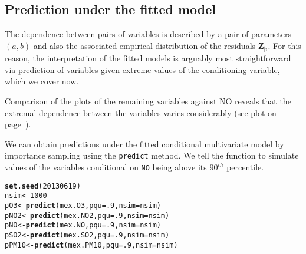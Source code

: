 \documentclass[10pt]{article}\usepackage[]{graphicx}\usepackage[]{color}
\makeatletter
\newcommand{\hlnum}[1]{\textcolor[rgb]{0.686,0.059,0.569}{#1}}%
\newcommand{\hlstd}[1]{\textcolor[rgb]{0.345,0.345,0.345}{#1}}%
\newcommand{\hlkwb}[1]{\textcolor[rgb]{0.69,0.353,0.396}{#1}}%
\newcommand{\hlkwc}[1]{\textcolor[rgb]{0.333,0.667,0.333}{#1}}%
\newcommand{\hlkwd}[1]{\textcolor[rgb]{0.737,0.353,0.396}{\textbf{#1}}}%
\newenvironment{kframe}{%
 \def\at@end@of@kframe{}%
 \ifinner\ifhmode%
  \def\at@end@of@kframe{\end{minipage}}%
  \begin{minipage}{\columnwidth}%
 \fi\fi%
 \def\FrameCommand##1{\hskip\@totalleftmargin \hskip-\fboxsep
 \colorbox{shadecolor}{##1}\hskip-\fboxsep
     \hskip-\linewidth \hskip-\@totalleftmargin \hskip\columnwidth}%
 \MakeFramed {\advance\hsize-\width
   \@totalleftmargin\z@ \linewidth\hsize
   \@setminipage}}%
 {\par\unskip\endMakeFramed%
 \at@end@of@kframe}
\newenvironment{knitrout}{}{} %
\def\bZ{\boldsymbol Z}
\makeatother
\begin{document}
%
\subsection{Prediction under the fitted model}
%
The dependence between pairs of variables is described by a pair of parameters
$(a,b)$ and also the associated empirical distribution of the residuals
$\bZ_{|i}$.  For this reason, the interpretation of the fitted models is
arguably most straightforward via prediction of variables given extreme values
of the conditioning variable, which we cover now.

Comparison of the plots of the remaining variables against NO
reveals that the extremal dependence between the variables
varies considerably (see plot on page~\pageref{fig:NO.Data}).

We can obtain predictions under the fitted conditional multivariate
model by importance sampling using the {\tt predict} method. We tell the function
to simulate values of the variables conditional on {\tt NO}
being above its $90^{th}$ percentile.

\begin{knitrout}
\color{fgcolor}\begin{kframe}
\begin{alltt}
\hlkwd{set.seed}\hlstd{(}\hlnum{20130619}\hlstd{)}
\hlstd{nsim} \hlkwb{<-} \hlnum{1000}
\hlstd{pO3} \hlkwb{<-} \hlkwd{predict}\hlstd{(mex.O3,} \hlkwc{pqu}\hlstd{=}\hlnum{.9}\hlstd{,} \hlkwc{nsim}\hlstd{=nsim)}
\hlstd{pNO2} \hlkwb{<-} \hlkwd{predict}\hlstd{(mex.NO2,} \hlkwc{pqu}\hlstd{=}\hlnum{.9}\hlstd{,} \hlkwc{nsim}\hlstd{=nsim)}
\hlstd{pNO} \hlkwb{<-} \hlkwd{predict}\hlstd{(mex.NO,} \hlkwc{pqu}\hlstd{=}\hlnum{.9}\hlstd{,} \hlkwc{nsim}\hlstd{=nsim)}
\hlstd{pSO2} \hlkwb{<-} \hlkwd{predict}\hlstd{(mex.SO2,} \hlkwc{pqu}\hlstd{=}\hlnum{.9}\hlstd{,} \hlkwc{nsim}\hlstd{=nsim)}
\hlstd{pPM10} \hlkwb{<-} \hlkwd{predict}\hlstd{(mex.PM10,} \hlkwc{pqu}\hlstd{=}\hlnum{.9}\hlstd{,} \hlkwc{nsim}\hlstd{=nsim)}
\end{alltt}
\end{kframe}
\end{knitrout}
\end{document}
